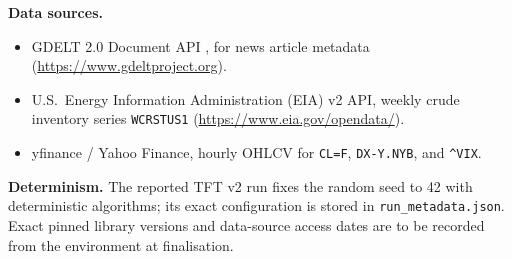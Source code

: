\textbf{Data sources.}
\begin{itemize}
  \item GDELT 2.0 Document API \citep{leetaru_schrodt2013}, for news article metadata (\url{https://www.gdeltproject.org}).
  \item U.S.\ Energy Information Administration (EIA) v2 API, weekly crude inventory series \texttt{WCRSTUS1} (\url{https://www.eia.gov/opendata/}).
  \item yfinance / Yahoo Finance, hourly OHLCV for \texttt{CL=F}, \texttt{DX-Y.NYB}, and \texttt{\^{}VIX}.
\end{itemize}

\textbf{Determinism.} The reported TFT v2 run fixes the random seed to 42 with deterministic algorithms; its exact configuration is stored in \texttt{run\_metadata.json}. Exact pinned library versions and data-source access dates are to be recorded from the environment at finalisation.
